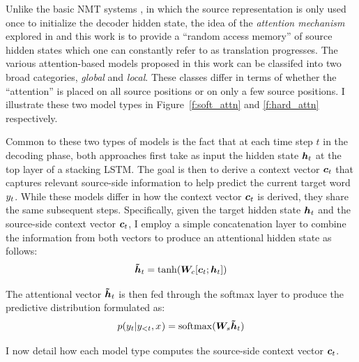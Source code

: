 Unlike the basic NMT systems \cite{kal13,sutskever14,cho14,luong15}, in which the source representation is only used once to initialize the decoder hidden state, the idea of the {\it attention mechanism} explored in \cite{bog15,jean15} and this work is to provide a ``random access memory'' of source hidden states which one can constantly refer to as translation progresses.
The various attention-based models proposed in this work can be classifed into two broad categories, {\it global} and {\it local}. These classes differ in terms of whether the ``attention'' is placed on all source positions or on only a few source positions. I illustrate these two model types in Figure~\ref{f:soft_attn} and \ref{f:hard_attn} respectively.

Common to these two types of models is the fact that at each time step $t$ in the decoding phase, both approaches first take as input the hidden state $\mbox{\boldmath{$h$}}_{t}$ at the top layer of a stacking LSTM. The goal is then to derive a context vector $\mbox{\boldmath{$c$}}_{t}$ that captures relevant source-side information to help predict the current target word $y_{t}$. While these models differ in how the context vector $\mbox{\boldmath{$c$}}_{t}$ is derived, they share the same subsequent steps. 
Specifically, given the target hidden state $\mbox{\boldmath{$h$}}_{t}$ and the source-side context vector $\mbox{\boldmath{$c$}}_{t}$, I employ a simple concatenation layer to combine the information from both vectors to produce an attentional hidden state as follows:
\begin{equation}
\mbox{\boldmath{$\tilde{h}$}}_{t} = \tanh(\bm{W}_{c}[\mbox{\boldmath{$c$}}_{t}; \mbox{\boldmath{$h$}}_{t}])
\label{e:hs}
\end{equation} 

The attentional vector $\mbox{\boldmath{$\tilde{h}$}}_{t}$ is then fed through the softmax layer to produce the predictive distribution formulated as:
\begin{equation}
p(y_{t}|y_{<t},x_{}) = \operatorname{softmax}(\bm{W}_{s}\mbox{\boldmath{$\tilde{h}$}}_{t})
\label{e:predict}
\end{equation} 

I now detail how each model type computes the source-side context vector $\mbox{\boldmath{$c$}}_{t}$.

